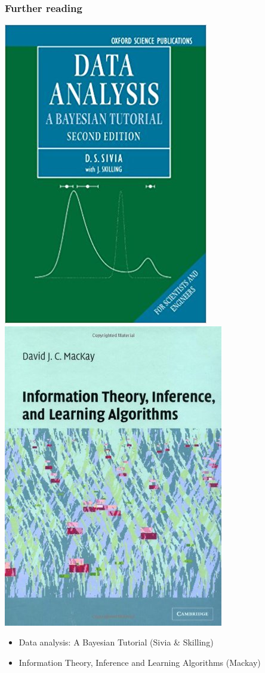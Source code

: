 \begin{frame}[label=further_reading]
    \frametitle{Further reading}
    \centerline{%
        \hfill{}
        \includegraphics[height=0.7\textheight]{./figures/sivia_skilling.jpg}
        \hfill{}
        \includegraphics[height=0.7\textheight]{./figures/mackay.jpg}
        \hfill{}
    }
    \begin{itemize}
        \item Data analysis: A Bayesian Tutorial (Sivia \& Skilling)
        \item Information Theory, Inference and Learning Algorithms (Mackay)
    \end{itemize}
\end{frame}

